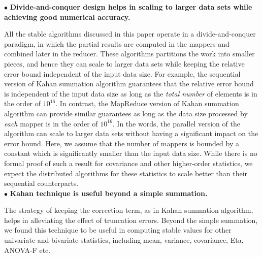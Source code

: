 
\noindent $\bullet$ \textbf{Divide-and-conquer design helps in scaling to larger data sets while achieving good numerical accuracy.} 

All the stable algorithms discussed in this paper operate in a divide-and-conquer paradigm, in which the partial results are computed in the mappers and combined later in the reducer. These algorithms partitions the work into smaller pieces, and hence they can scale to larger data sets while keeping the relative error bound independent of the input data size. For example, the sequential version of Kahan summation algorithm guarantees that the relative error bound is independent of the input data size as long as the {\em total number} of elements is in the order of $10^{16}$. In contrast, the MapReduce version of Kahan summation algorithm can provide similar guarantees as long as the data size processed by {\em each} mapper is in the order of $10^{16}$. In the words, the parallel version of the algorithm can scale to larger data sets without having a significant impact on the error bound. Here, we assume that the number of mappers is bounded by a constant which is significantly smaller than the input data size. While there is no formal proof of such a result for covariance and other higher-order statistics, we expect the distributed algorithms for these statistics to scale better than their sequential counterparts.
\\


\noindent $\bullet$ \textbf{Kahan technique is useful beyond a simple summation.} 

The strategy of keeping the correction term, as in Kahan summation algorithm, helps in alleviating the effect of truncation errors. Beyond the simple summation, we found this technique to be useful in computing stable values for other univariate and bivariate statistics, including mean, variance, covariance, Eta, ANOVA-F etc.

